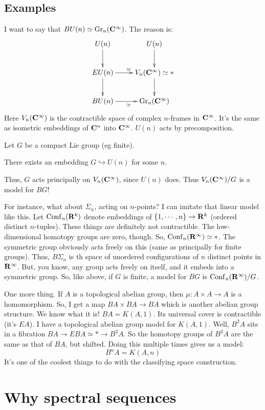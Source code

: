 \subsection{Examples}
I want to say that $BU(n)\simeq \mathrm{Gr}_n(\mathbf C^\infty)$.
The reason is:
\begin{equation*}
    \xymatrix{
	U(n)\ar[d] & U(n)\ar[d]\\
	EU(n) \ar[d] \ar[r]^{\simeq} & V_n(\cc^\infty)\simeq \ast\ar[d]\\
	BU(n) \ar[r]_{\simeq} & \Gra_n(\cc^\infty)
    }
\end{equation*}
Here $V_n(\mathbf C^\infty)$ is the contractible space of complex $n$-frames in $\mathbf C^\infty$.
It's the same as isometric embeddings of $\mathbf C^n$ into $\mathbf C^\infty$.
$U(n)$ acts by precomposition.

Let $G$ be a compact Lie group (eg finite).
\begin{theorem}
    There exists an embedding $G\hookrightarrow U(n)$ for some $n$.
\end{theorem}
Thus, $G$ acts principally on $V_n(\mathbf C^\infty)$, since $U(n)$ does.
Thus $V_n(\mathbf C^\infty)/G$ is a model for $BG$!

For instance, what about $\Sigma_n$, acting on $n$-points?
I can imitate that linear model like this.
Let $\mathrm{Conf}_n(\mathbf R^k)$ denote embeddings of $\{1,\cdots,n\}\to \mathbf R^k$ (ordered distinct $n$-tuples).
These things are definitely not contractible.
The low-dimensional homotopy groups are zero, though.
So, $\mathrm{Conf}_n(\mathbf R^\infty)\simeq \ast$.
The symmetric group obviously acts freely on this (same as principally for finite groups).
Thus, $B\Sigma_n$ is th space of unordered configurations of $n$ distinct points in $\mathbf R^\infty$.
But, you know, any group acts freely on itself, and it embeds into a symmetric group.
So, like above, if $G$ is finite, a model for $BG$ is $\mathrm{Conf}_n(\mathbf R^\infty)/G$.

One more thing.
If $A$ is a topological abelian group, then $\mu:A\times A\to A$ is a homomorphism.
So, I get a map $BA\times BA\to BA$ which is another abelian group structure.
We know what it is!
$BA = K(A, 1)$.
Its universal cover is contractible (it's $EA$).
I have a topological abelian group model for $K(A, 1)$.
Well, $B^2 A$ sits in a fibration $BA \to EBA\simeq \ast \to B^2 A$.
So the homotopy groups of $B^2 A$ are the same as that of $BA$, but shifted.
Doing this multiple times gives us a model:
$$B^n A = K(A, n)$$
It's one of the coolest things to do with the classifying space construction.
\section{Why spectral sequences}
